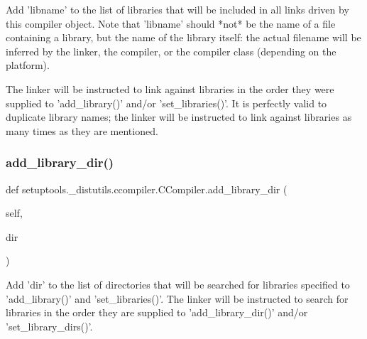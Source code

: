 \begin{DoxyVerb}Add 'libname' to the list of libraries that will be included in
all links driven by this compiler object.  Note that 'libname'
should *not* be the name of a file containing a library, but the
name of the library itself: the actual filename will be inferred by
the linker, the compiler, or the compiler class (depending on the
platform).

The linker will be instructed to link against libraries in the
order they were supplied to 'add_library()' and/or
'set_libraries()'.  It is perfectly valid to duplicate library
names; the linker will be instructed to link against libraries as
many times as they are mentioned.
\end{DoxyVerb}
 \mbox{\label{classsetuptools_1_1__distutils_1_1ccompiler_1_1CCompiler_ac3ea9122dec1e5a64f83be7d9a78634a}} 
\subsubsection{\texorpdfstring{add\+\_\+library\+\_\+dir()}{add\_library\_dir()}}
{\footnotesize\ttfamily def setuptools.\+\_\+distutils.\+ccompiler.\+C\+Compiler.\+add\+\_\+library\+\_\+dir (\begin{DoxyParamCaption}\item[{}]{self,  }\item[{}]{dir }\end{DoxyParamCaption})}

\begin{DoxyVerb}Add 'dir' to the list of directories that will be searched for
libraries specified to 'add_library()' and 'set_libraries()'.  The
linker will be instructed to search for libraries in the order they
are supplied to 'add_library_dir()' and/or 'set_library_dirs()'.
\end{DoxyVerb}
 \mbox{\label{classsetuptools_1_1__distutils_1_1ccompiler_1_1CCompiler_a383700bcf99c78579dae9c6c3cb24d02}} 
